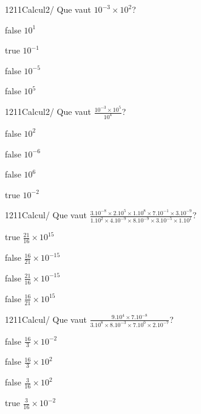         	\begin{question}{1211}{Calcul}{2}{/}
                Que vaut $10^{-3}\times 10^2$?
            \end{question}
            \begin{reponses}
            	\item[false] $10^{1}$
            	\item[true] $10^{-1}$
                \item[false] $10^{-5}$
                \item[false] $10^{5}$
            \end{reponses}
            \begin{question}{1211}{Calcul}{2}{/}
                Que vaut $\frac{10^{-3}\times 10^{5}}{10^{4}}$?
            \end{question}
            \begin{reponses}
                \item[false] $10^{2}$
                \item[false] $10^{-6}$
                \item[false] $10^{6}$
                \item[true] $10^{-2}$
            \end{reponses}
            \begin{question}{1211}{Calcul}{}{/}
                Que vaut $\frac{3.10^{-8}\times 2.10^{5}\times 1.10^{8}\times 7.10^{-1}\times 3.10^{-9}}{1.10^{2}\times 4.10^{-9}\times 8.10^{-9}\times 3.10^{-5}\times 1.10^{1}}$?
            \end{question}
            \begin{reponses}
                \item[true] $\frac{21}{16}\times 10^{15}$
                \item[false] $\frac{16}{21}\times 10^{-15}$
                \item[false] $\frac{21}{16}\times 10^{-15}$
                \item[false] $\frac{16}{21}\times 10^{15}$
            \end{reponses}
            \begin{question}{1211}{Calcul}{}{/}
                Que vaut $\frac{9.10^{4}\times 7.10^{-8}}{3.10^{8}\times 8.10^{-3}\times 7.10^{0}\times 2.10^{-7}}$?
            \end{question}
            \begin{reponses}
                \item[false] $\frac{16}{3}\times 10^{-2}$
                \item[false] $\frac{16}{3}\times 10^{2}$
                \item[false] $\frac{3}{16}\times 10^{2}$
                \item[true] $\frac{3}{16}\times 10^{-2}$
            \end{reponses}
